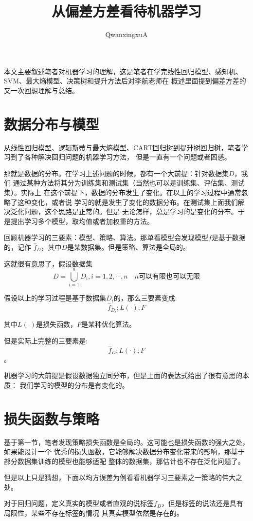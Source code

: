 \documentclass{article}
\title{从偏差方差看待机器学习}
\author{QwanxingxuA}
\begin{document}
\maketitle
    本文主要叙述笔者对机器学习的理解，这是笔者在学完线性回归模型、感知机、SVM、最大熵模型、决策树和提升方法后对李航老师在
    概述里面提到偏差方差的又一次回想理解与总结。
    \section{数据分布与模型}
    从线性回归模型、逻辑斯蒂与最大熵模型、CART回归树到提升树回归树，笔者学习到了各种解决回归问题的机器学习方法，
    但是一直有一个问题或者困惑。

    那就是数据的分布。在学习上述问题的时候，都有一个大前提：针对数据集$D$，我们
    通过某种方法将其分为训练集和测试集（当然也可以是训练集、评估集、测试集）。实际上
    在这个前提下，数据的分布发生了变化。在以上的学习过程中通常忽略了这种变化，或者说
    学习的就是发生了变化的数据分布。在测试集上面我们解决泛化问题，这个思路是正常的。但是
    无论怎样，总是学习的是变化的分布。于是提出学习多个模型，取均值或者加权重的方法。

    回顾机器学习的三要素：模型、策略、算法。那单看模型会发现模型$f$是基于数据的，记作
    $\widehat{f}_D$，其中$D$是某数据集。但是策略、算法是全局的。

    这就很有意思了，假设数据集
    \[D=\bigcup_{i=1}^{n}D_i,i=1,2,\cdots,n\quad n\text{可以有限也可以无限}\]

    假设以上的学习过程是基于数据集$D_i$的，那么三要素变成:
    \[\widehat{f}_{D_i};L(\cdot);F\]
    
    其中$L(\cdot)$是损失函数，$F$是某种优化算法。

    但是实际上完整的三要素是:
    \[\widehat{f}_D;L(\cdot);F\]。

    机器学习的大前提是假设数据独立同分布，但是上面的表达式给出了很有意思的本质：
    我们学习的模型的分布是有变化的。

    \section{损失函数与策略}
    基于第一节，笔者发现策略损失函数是全局的。这可能也是损失函数的强大之处，如果能设计一个
    优秀的损失函数，它能够解决数据分布变化带来的影响，那基于部分数据集训练的模型也能够适配
    整体的数据集，那估计也不存在泛化问题了。

    但是以上只是猜想，下面以均方误差为例看看机器学习三要素之一策略的伟大之处。

    对于回归问题，定义真实的模型或者直观的说标签$f_D$，但是标签的说法还是具有局限性，某些不存在标签的情况
    其真实模型依然是存在的。
    
\end{document}
